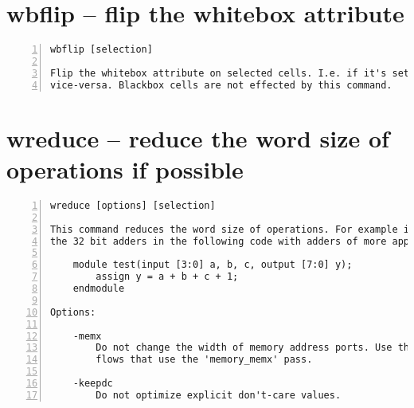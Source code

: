\section{wbflip -- flip the whitebox attribute}
\label{cmd:wbflip}
\begin{lstlisting}[numbers=left,frame=single]
    wbflip [selection]

Flip the whitebox attribute on selected cells. I.e. if it's set, unset it, and
vice-versa. Blackbox cells are not effected by this command.
\end{lstlisting}

\section{wreduce -- reduce the word size of operations if possible}
\label{cmd:wreduce}
\begin{lstlisting}[numbers=left,frame=single]
    wreduce [options] [selection]

This command reduces the word size of operations. For example it will replace
the 32 bit adders in the following code with adders of more appropriate widths:

    module test(input [3:0] a, b, c, output [7:0] y);
        assign y = a + b + c + 1;
    endmodule

Options:

    -memx
        Do not change the width of memory address ports. Use this options in
        flows that use the 'memory_memx' pass.

    -keepdc
        Do not optimize explicit don't-care values.
\end{lstlisting}

